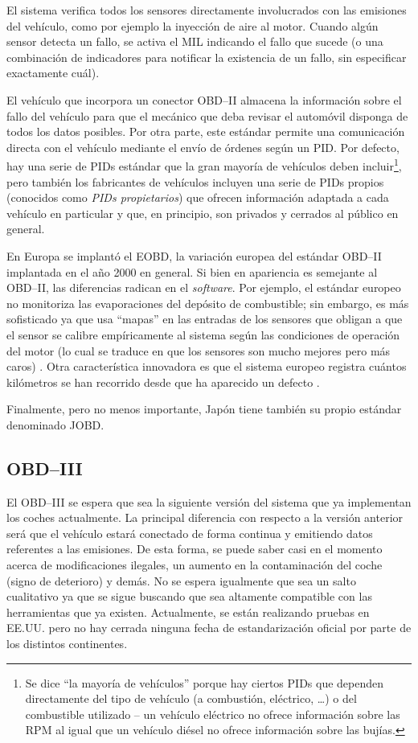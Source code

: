 El sistema verifica todos los sensores directamente involucrados con las emisiones
del vehículo, como por ejemplo la inyección de aire al motor. Cuando algún sensor detecta
un fallo, se activa el \ac{MIL} indicando el fallo que sucede (o una combinación
de indicadores para notificar la existencia de un fallo, sin especificar exactamente
cuál).

El vehículo que incorpora un conector \ac{OBD}--II almacena la información sobre el
fallo del vehículo para que el mecánico que deba revisar el automóvil disponga de todos
los datos posibles. Por otra parte, este estándar permite una comunicación directa
con el vehículo mediante el envío de órdenes según un \ac{PID}. Por defecto, hay
una serie de \ac{PID}s estándar que la gran mayoría de vehículos deben incluir\footnote{%
Se dice ``la mayoría de vehículos'' porque hay ciertos \ac{PID}s que dependen
directamente del tipo de vehículo (a combustión, eléctrico, \dots) o del combustible
utilizado -- un vehículo eléctrico no ofrece información sobre las \ac{RPM} al igual
que un vehículo diésel no ofrece información sobre las bujías.}, pero también
los fabricantes de vehículos incluyen una serie de \ac{PID}s propios (conocidos como
\textit{\ac{PID}s propietarios}) que ofrecen información adaptada a cada vehículo
en particular y que, en principio, son privados y cerrados al público en general.

En Europa se implantó el \ac{EOBD}, la variación europea del estándar \ac{OBD}--II
implantada en el año 2000 en general. Si bien en apariencia es semejante al \ac{OBD}--II,
las diferencias radican en el \textit{software}. Por ejemplo, el estándar europeo
no monitoriza las evaporaciones del depósito de combustible; sin embargo, es más
sofisticado ya que usa ``mapas'' en las entradas de los sensores que obligan a que el
sensor se calibre empíricamente al sistema según las condiciones de operación del
motor (lo cual se traduce en que los sensores son mucho mejores pero más caros)
\cite{SistemaOBD2Historia}. Otra característica innovadora es que el sistema
europeo registra cuántos kilómetros se han recorrido desde que ha aparecido un
defecto \cite{EOBDOBD2}.

Finalmente, pero no menos importante, Japón tiene también su propio estándar denominado
\ac{JOBD}.

\subsection*{OBD--III}
El \ac{OBD}--III se espera que sea la siguiente versión del sistema que ya implementan
los coches actualmente. La principal diferencia con respecto a la versión anterior
será que el vehículo estará conectado de forma continua y emitiendo datos referentes
a las emisiones. De esta forma, se puede saber casi en el momento acerca de modificaciones
ilegales, un aumento en la contaminación del coche (signo de deterioro) y demás. No se
espera igualmente que sea un salto cualitativo ya que se sigue buscando que sea
altamente compatible con las herramientas que ya existen. Actualmente, se están
realizando pruebas en EE.UU. pero no hay cerrada ninguna fecha de estandarización
oficial por parte de los distintos continentes.

